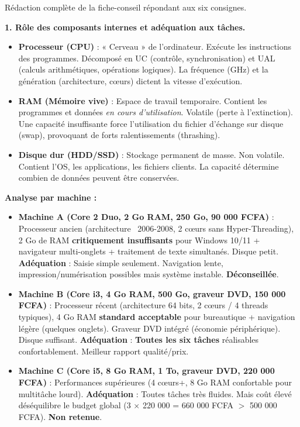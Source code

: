 \documentclass[11pt]{article}
\newcounter{popsec}
\newcounter{popsub}
\newcommand{\courssub}[1]{%
  \stepcounter{popsub}%
  \par\vspace{9pt}\noindent{\popxbold\fontsize{11.5}{13}\selectfont\color{popink}{\color{poporange}\thepopsec.\thepopsub}\hspace{6pt}#1}\par\nopagebreak\vspace{4pt}
}
\begin{document}
\courssub{Démarche et corrigé commenté}

\begin{exoresolu}
Rédaction complète de la fiche-conseil répondant aux six consignes.
\tcblower

\textbf{1. Rôle des composants internes et adéquation aux tâches.}

\begin{itemize}
\item \textbf{Processeur (CPU)} : « Cerveau » de l'ordinateur. Exécute les instructions des programmes. Décomposé en UC (contrôle, synchronisation) et UAL (calculs arithmétiques, opérations logiques). La fréquence (GHz) et la génération (architecture, cœurs) dictent la vitesse d'exécution.
\item \textbf{RAM (Mémoire vive)} : Espace de travail temporaire. Contient les programmes et données \emph{en cours d'utilisation}. Volatile (perte à l'extinction). Une capacité insuffisante force l'utilisation du fichier d'échange sur disque (swap), provoquant de forts ralentissements (thrashing).
\item \textbf{Disque dur (HDD/SSD)} : Stockage permanent de masse. Non volatile. Contient l'OS, les applications, les fichiers clients. La capacité détermine combien de données peuvent être conservées.
\end{itemize}

\textbf{Analyse par machine :}
\begin{itemize}
\item \textbf{Machine A (Core 2 Duo, 2 Go RAM, 250 Go, 90 000 FCFA)} : Processeur ancien (architecture ~2006-2008, 2 cœurs sans Hyper-Threading), 2 Go de RAM \textbf{critiquement insuffisants} pour Windows 10/11 + navigateur multi-onglets + traitement de texte simultanés. Disque petit. \textbf{Adéquation} : Saisie simple seulement. Navigation lente, impression/numérisation possibles mais système instable. \textbf{Déconseillée}.
\item \textbf{Machine B (Core i3, 4 Go RAM, 500 Go, graveur DVD, 150 000 FCFA)} : Processeur récent (architecture 64 bits, 2 cœurs / 4 threads typiques), 4 Go RAM \textbf{standard acceptable} pour bureautique + navigation légère (quelques onglets). Graveur DVD intégré (économie périphérique). Disque suffisant. \textbf{Adéquation} : \textbf{Toutes les six tâches} réalisables confortablement. Meilleur rapport qualité/prix.
\item \textbf{Machine C (Core i5, 8 Go RAM, 1 To, graveur DVD, 220 000 FCFA)} : Performances supérieures (4 cœurs+, 8 Go RAM confortable pour multitâche lourd). \textbf{Adéquation} : Toutes tâches très fluides. Mais coût élevé déséquilibre le budget global (3 $\times$ 220 000 = 660 000 FCFA $>$ 500 000 FCFA). \textbf{Non retenue}.
\end{itemize}


\end{exoresolu}
\end{document}

